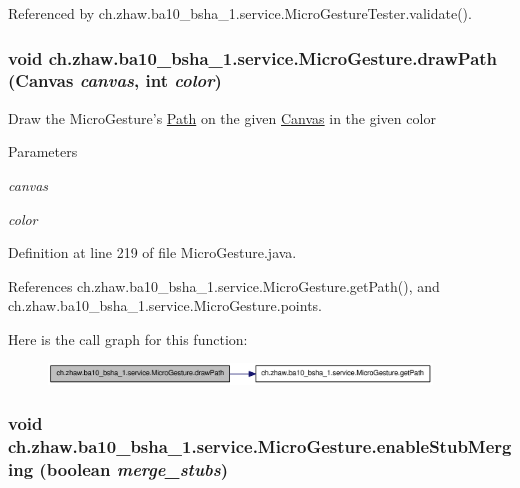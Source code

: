 Referenced by ch.zhaw.ba10\_\-bsha\_\-1.service.MicroGestureTester.validate().\hypertarget{classch_1_1zhaw_1_1ba10__bsha__1_1_1service_1_1MicroGesture_aa06eca44734c4df4bc13c1d045724904}{
\subsubsection[{drawPath}]{\setlength{\rightskip}{0pt plus 5cm}void ch.zhaw.ba10\_\-bsha\_\-1.service.MicroGesture.drawPath (Canvas {\em canvas}, \/  int {\em color})}}
\label{classch_1_1zhaw_1_1ba10__bsha__1_1_1service_1_1MicroGesture_aa06eca44734c4df4bc13c1d045724904}
Draw the MicroGesture's \hyperlink{}{Path} on the given \hyperlink{}{Canvas} in the given color


\begin{DoxyParams}{Parameters}
\item[{\em canvas}]\item[{\em color}]\end{DoxyParams}


Definition at line 219 of file MicroGesture.java.

References ch.zhaw.ba10\_\-bsha\_\-1.service.MicroGesture.getPath(), and ch.zhaw.ba10\_\-bsha\_\-1.service.MicroGesture.points.

Here is the call graph for this function:\nopagebreak
\begin{figure}[H]
\begin{center}
\leavevmode
\includegraphics[width=289pt]{classch_1_1zhaw_1_1ba10__bsha__1_1_1service_1_1MicroGesture_aa06eca44734c4df4bc13c1d045724904_cgraph}
\end{center}
\end{figure}
\hypertarget{classch_1_1zhaw_1_1ba10__bsha__1_1_1service_1_1MicroGesture_ad5c219a463ce524eb0778e71717e7938}{
\subsubsection[{enableStubMerging}]{\setlength{\rightskip}{0pt plus 5cm}void ch.zhaw.ba10\_\-bsha\_\-1.service.MicroGesture.enableStubMerging (boolean {\em merge\_\-stubs})}}
\label{classch_1_1zhaw_1_1ba10__bsha__1_1_1service_1_1MicroGesture_ad5c219a463ce524eb0778e71717e7938}


